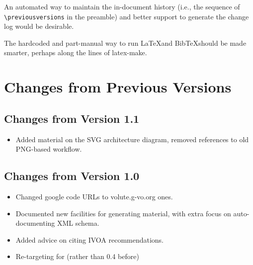 \documentclass[11pt,a4paper]{ivoa}
\begin{document}
An automated way to maintain the in-document history (i.e., the sequence
of \verb|\previousversions| in the preamble) and better support to
generate the change log would be desirable.

The hardcoded and part-manual way to run \LaTeX and Bib\TeX should be
made smarter, perhaps along the lines of latex-make.

\appendix
\section{Changes from Previous Versions}

\subsection{Changes from Version 1.1}

\begin{itemize}
\item Added material on the SVG architecture diagram, removed references
to old PNG-based workflow.
\end{itemize}

\subsection{Changes from Version 1.0}
\begin{itemize}
\item Changed google code URLs to volute.g-vo.org ones.
\item Documented new facilities for generating material, with extra
focus on auto-documenting XML schema.
\item Added advice on citing IVOA recommendations.
\item Re-targeting for  (rather than 0.4 before)
\end{itemize}



\end{document}
